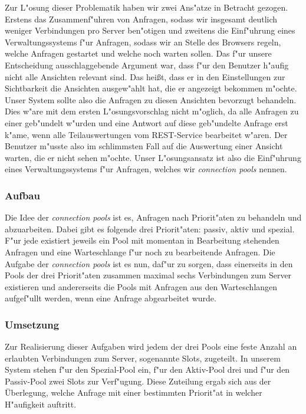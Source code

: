 Zur L"osung dieser Problematik haben wir zwei Ans"atze in Betracht gezogen. Erstens das Zusammenf"uhren von Anfragen, sodass wir insgesamt deutlich weniger Verbindungen pro Server ben"otigen und zweitens die Einf"uhrung eines Verwaltungssystems f"ur Anfragen, sodass wir an Stelle des Browsers regeln, welche Anfragen gestartet und welche noch warten sollen.
Das f"ur unsere Entscheidung ausschlaggebende Argument war, dass f"ur den Benutzer h"aufig nicht alle Ansichten relevant sind. Das hei\ss{}t, dass er in den Einstellungen zur Sichtbarkeit die Ansichten ausgew"ahlt hat, die er angezeigt bekommen m"ochte. Unser System sollte also die Anfragen zu diesen Ansichten bevorzugt behandeln. Dies w"are mit dem ersten L"osungsvorschlag nicht m"oglich, da alle Anfragen zu einer geb"undelt w"urden und eine Antwort auf diese geb"undelte Anfrage erst k"ame, wenn alle Teilauswertungen vom REST-Service bearbeitet w"aren.
Der Benutzer m"usste also im schlimmsten Fall auf die Auswertung einer Ansicht warten, die er nicht sehen m"ochte.
Unser L"osungsansatz ist also die Einf"uhrung eines Verwaltungssystems f"ur Anfragen, welches wir \textit{connection pools} nennen.

\subsubsection{Aufbau}
Die Idee der \textit{connection pools} ist es, Anfragen nach Priorit"aten zu behandeln und abzuarbeiten. Dabei gibt es folgende drei Priorit"aten: passiv, aktiv und spezial. F"ur jede existiert jeweils ein Pool mit momentan in Bearbeitung stehenden Anfragen und eine Warteschlange f"ur noch zu bearbeitende Anfragen. Die Aufgabe der \textit{connection pools} ist es nun, daf"ur zu sorgen, dass einerseits in den Pools der drei Priorit"aten zusammen maximal sechs Verbindungen zum Server existieren und andererseits die Pools mit Anfragen aus den Warteschlangen aufgef"ullt werden, wenn eine Anfrage abgearbeitet wurde.

\subsubsection{Umsetzung}
Zur Realisierung dieser Aufgaben wird jedem der drei Pools eine feste Anzahl an erlaubten Verbindungen zum Server, sogenannte Slots, zugeteilt. In unserem System stehen f"ur den Spezial-Pool ein, f"ur den Aktiv-Pool drei und f"ur den Passiv-Pool zwei Slots zur Verf"ugung. Diese Zuteilung ergab sich aus der Überlegung, welche Anfrage mit einer bestimmten Priorit"at in welcher H"aufigkeit auftritt.

